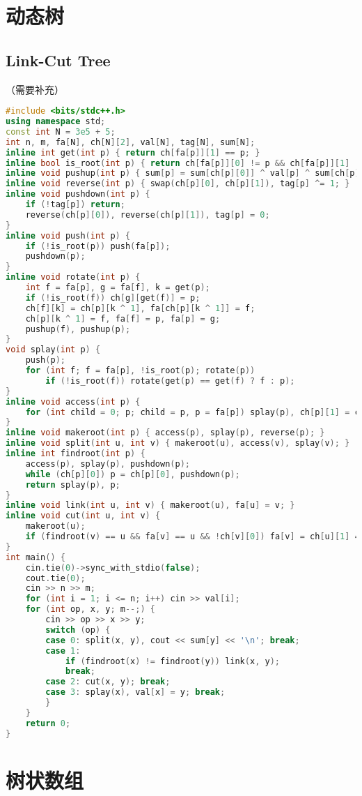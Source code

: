 \documentclass[9pt, a4paper, oneside]{book}
\begin{document}
\section{动态树}
\subsection{Link-Cut Tree}
（需要补充）
\begin{lstlisting}[language={C++}]
#include <bits/stdc++.h>
using namespace std;
const int N = 3e5 + 5;
int n, m, fa[N], ch[N][2], val[N], tag[N], sum[N];
inline int get(int p) { return ch[fa[p]][1] == p; }
inline bool is_root(int p) { return ch[fa[p]][0] != p && ch[fa[p]][1] != p; }
inline void pushup(int p) { sum[p] = sum[ch[p][0]] ^ val[p] ^ sum[ch[p][1]]; }
inline void reverse(int p) { swap(ch[p][0], ch[p][1]), tag[p] ^= 1; }
inline void pushdown(int p) {
    if (!tag[p]) return;
    reverse(ch[p][0]), reverse(ch[p][1]), tag[p] = 0;
}
inline void push(int p) {
    if (!is_root(p)) push(fa[p]);
    pushdown(p);
}
inline void rotate(int p) {
    int f = fa[p], g = fa[f], k = get(p);
    if (!is_root(f)) ch[g][get(f)] = p;
    ch[f][k] = ch[p][k ^ 1], fa[ch[p][k ^ 1]] = f;
    ch[p][k ^ 1] = f, fa[f] = p, fa[p] = g;
    pushup(f), pushup(p);
}
void splay(int p) {
    push(p);
    for (int f; f = fa[p], !is_root(p); rotate(p))
        if (!is_root(f)) rotate(get(p) == get(f) ? f : p);
}
inline void access(int p) {
    for (int child = 0; p; child = p, p = fa[p]) splay(p), ch[p][1] = child, pushup(p);
}
inline void makeroot(int p) { access(p), splay(p), reverse(p); }
inline void split(int u, int v) { makeroot(u), access(v), splay(v); }
inline int findroot(int p) {
    access(p), splay(p), pushdown(p);
    while (ch[p][0]) p = ch[p][0], pushdown(p);
    return splay(p), p;
}
inline void link(int u, int v) { makeroot(u), fa[u] = v; }
inline void cut(int u, int v) {
    makeroot(u);
    if (findroot(v) == u && fa[v] == u && !ch[v][0]) fa[v] = ch[u][1] = 0, pushup(u);
}
int main() {
    cin.tie(0)->sync_with_stdio(false);
    cout.tie(0);
    cin >> n >> m;
    for (int i = 1; i <= n; i++) cin >> val[i];
    for (int op, x, y; m--;) {
        cin >> op >> x >> y;
        switch (op) {
        case 0: split(x, y), cout << sum[y] << '\n'; break;
        case 1:
            if (findroot(x) != findroot(y)) link(x, y);
            break;
        case 2: cut(x, y); break;
        case 3: splay(x), val[x] = y; break;
        }
    }
    return 0;
}
\end{lstlisting}
\section{树状数组}
\end{document}

